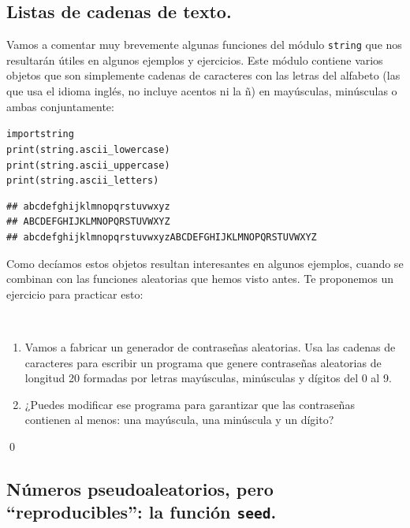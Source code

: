 \documentclass[10pt,a4paper]{article}\usepackage[]{graphicx}\usepackage[]{color}
\makeatletter
\newenvironment{kframe}{%
 \def\at@end@of@kframe{}%
 \ifinner\ifhmode%
  \def\at@end@of@kframe{\end{minipage}}%
  \begin{minipage}{\columnwidth}%
 \fi\fi%
 \def\FrameCommand##1{\hskip\@totalleftmargin \hskip-\fboxsep
 \colorbox{shadecolor}{##1}\hskip-\fboxsep
     \hskip-\linewidth \hskip-\@totalleftmargin \hskip\columnwidth}%
 \MakeFramed {\advance\hsize-\width
   \@totalleftmargin\z@ \linewidth\hsize
   \@setminipage}}%
 {\par\unskip\endMakeFramed%
 \at@end@of@kframe}
\newenvironment{knitrout}{}{} %
\newcounter {cont01}
\makeatother
\begin{document}
\subsection{Listas de cadenas de texto. }

Vamos a comentar muy brevemente algunas funciones del módulo {\tt string} que nos resultarán útiles en algunos ejemplos y ejercicios. Este módulo contiene varios objetos que son simplemente cadenas de caracteres con las letras del alfabeto (las que usa el idioma inglés, no incluye acentos ni la ñ) en mayúsculas, minúsculas o ambas conjuntamente:
\begin{knitrout}
\color{fgcolor}\begin{kframe}
\begin{alltt}
import string
print(string.ascii_lowercase)
print(string.ascii_uppercase)
print(string.ascii_letters)
\end{alltt}

\begin{verbatim}
## abcdefghijklmnopqrstuvwxyz
## ABCDEFGHIJKLMNOPQRSTUVWXYZ
## abcdefghijklmnopqrstuvwxyzABCDEFGHIJKLMNOPQRSTUVWXYZ
\end{verbatim}
\end{kframe}
\end{knitrout}
Como decíamos estos objetos resultan interesantes en algunos ejemplos, cuando se combinan con las funciones aleatorias que hemos visto antes. Te proponemos un ejercicio para practicar esto:
\begin{ejercicio}
\label{tut02:ejercicio27}
\quad\\
\begin{enumerate}
\item Vamos a fabricar un generador de contraseñas aleatorias. Usa las cadenas de caracteres para escribir un programa que genere contraseñas aleatorias de longitud 20 formadas por letras mayúsculas, minúsculas y dígitos del 0 al 9.
\item ¿Puedes modificar ese programa para garantizar que las contraseñas contienen al menos: una mayúscula, una minúscula y un dígito?
\end{enumerate}
\qed
\end{ejercicio}

\subsection{Números pseudoaleatorios, pero ``reproducibles'': la función {\tt seed}.}
\label{tut02:subsec:numerosAleatoriosReproduciblesSeed}
\end{document}

